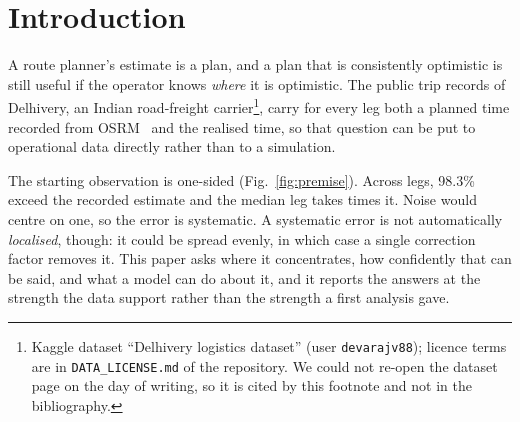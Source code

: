 \section{Introduction}\label{sec:intro}

A route planner's estimate is a plan, and a plan that is consistently optimistic is still useful if the operator knows \emph{where} it is optimistic. The public trip records of Delhivery, an Indian road-freight carrier\footnote{Kaggle dataset ``Delhivery logistics dataset'' (user \texttt{devarajv88}); licence terms are in \texttt{DATA\_LICENSE.md} of the repository. We could not re-open the dataset page on the day of writing, so it is cited by this footnote and not in the bibliography.}, carry for every leg both a planned time recorded from OSRM~\cite{luxen2011real} and the realised time, so that question can be put to operational data directly rather than to a simulation.

The starting observation is one-sided\ifjournal{} (Fig.~\ref{fig:premise})\fi. Across \fzLegsTotal{} legs, 98.3\% exceed the recorded estimate and the median leg takes \fzMedianGapRatioDpOne{} times it. Noise would centre on one, so the error is systematic. A systematic error is not automatically \emph{localised}, though: it could be spread evenly, in which case a single correction factor removes it. This paper asks where it concentrates, how confidently that can be said, and what a model can do about it, and it reports the answers at the strength the data support rather than the strength a first analysis gave.

